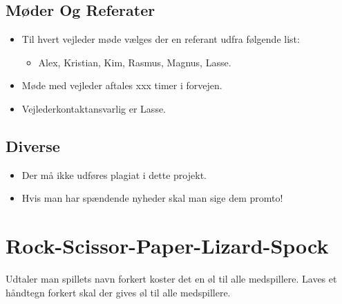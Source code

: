 \documentclass{article}
\begin{document}
\subsection{M\o{}der Og Referater}
\begin{itemize}
	\item Til hvert vejleder m\o{}de vælges der en referant udfra f\o{}lgende list:
	\begin{itemize}
		\item Alex, Kristian, Kim, Rasmus, Magnus, Lasse.
	\end{itemize}
	\item Møde med vejleder aftales xxx timer i forvejen.
	\item Vejlederkontaktansvarlig er Lasse. 
\end{itemize}

\subsection{Diverse}
\begin{itemize}
	\item Der må ikke udføres plagiat i dette projekt.
	\item Hvis man har spændende nyheder skal man sige dem promto!
\end{itemize}

\appendix
\section{Rock-Scissor-Paper-Lizard-Spock}
\item Udtaler man spillets navn forkert koster det en \o{}l til alle medspillere. Laves et h\aa{}ndtegn forkert skal der gives \o{}l til alle medspillere. 
\label{app:game}
\end{document}
